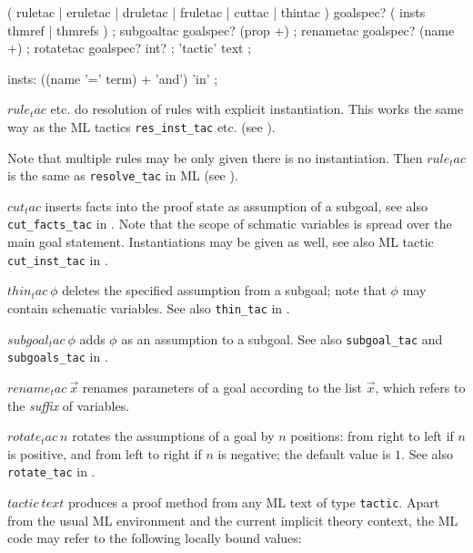


\begin{rail}
  ( ruletac | eruletac | druletac | fruletac | cuttac | thintac ) goalspec?
  ( insts thmref | thmrefs )
  ;
  subgoaltac goalspec? (prop +)
  ;
  renametac goalspec? (name +)
  ;
  rotatetac goalspec? int?
  ;
  'tactic' text
  ;

  insts: ((name '=' term) + 'and') 'in'
  ;
\end{rail}

\begin{descr}
\item [$rule_tac$ etc.] do resolution of rules with explicit instantiation.
  This works the same way as the ML tactics \texttt{res_inst_tac} etc. (see
  \cite[\S3]{isabelle-ref}).

  Note that multiple rules may be only given there is no instantiation.  Then
  $rule_tac$ is the same as \texttt{resolve_tac} in ML (see
  \cite[\S3]{isabelle-ref}).
\item [$cut_tac$] inserts facts into the proof state as assumption of a
  subgoal, see also \texttt{cut_facts_tac} in \cite[\S3]{isabelle-ref}.  Note
  that the scope of schmatic variables is spread over the main goal statement.
  Instantiations may be given as well, see also ML tactic
  \texttt{cut_inst_tac} in \cite[\S3]{isabelle-ref}.
\item [$thin_tac~\phi$] deletes the specified assumption from a subgoal; note
  that $\phi$ may contain schematic variables.  See also \texttt{thin_tac} in
  \cite[\S3]{isabelle-ref}.
\item [$subgoal_tac~\phi$] adds $\phi$ as an assumption to a subgoal.  See
  also \texttt{subgoal_tac} and \texttt{subgoals_tac} in
  \cite[\S3]{isabelle-ref}.
\item [$rename_tac~\vec x$] renames parameters of a goal according to the list
  $\vec x$, which refers to the \emph{suffix} of variables.
\item [$rotate_tac~n$] rotates the assumptions of a goal by $n$ positions:
  from right to left if $n$ is positive, and from left to right if $n$ is
  negative; the default value is $1$.  See also \texttt{rotate_tac} in
  \cite[\S3]{isabelle-ref}.
\item [$tactic~text$] produces a proof method from any ML text of type
  \texttt{tactic}.  Apart from the usual ML environment and the current
  implicit theory context, the ML code may refer to the following locally
  bound values:


\end{descr}
